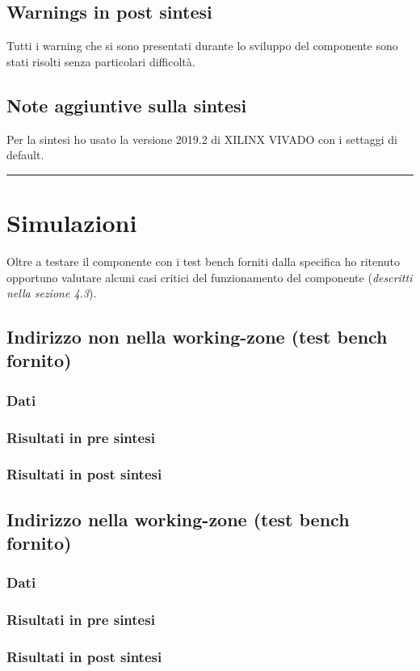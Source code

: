 \documentclass{article}
\begin{document}
\subsection{Warnings in post sintesi}
Tutti i warning che si sono presentati durante lo sviluppo del componente sono stati risolti senza particolari difficoltà.
\subsection{Note aggiuntive sulla sintesi}
Per la sintesi ho usato la versione 2019.2 di XILINX VIVADO con i settaggi di default.

\noindent\rule{\textwidth}{0.5pt}
\newpage
\section{Simulazioni}
Oltre a testare il componente con i test bench forniti dalla specifica ho ritenuto opportuno valutare alcuni casi critici del funzionamento del componente (\textit{descritti nella sezione 4.3}).
\subsection{Indirizzo non nella working-zone (test bench fornito)}
\subsubsection{Dati}
\subsubsection{Risultati in pre sintesi}
\subsubsection{Risultati in post sintesi}
\subsection{Indirizzo nella working-zone (test bench fornito)}
\subsubsection{Dati}
\subsubsection{Risultati in pre sintesi}
\subsubsection{Risultati in post sintesi}
\end{document}
